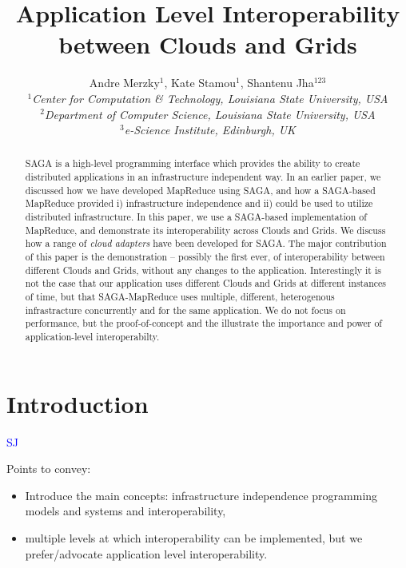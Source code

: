 \documentclass[conference,final]{IEEEtran}
\title{Application Level Interoperability between Clouds and Grids}
\author{Andre Merzky$^{1}$,  Kate Stamou$^{1}$, Shantenu Jha$^{123}$\\
  \small{\emph{$^{1}$Center for Computation \& Technology, Louisiana
      State University, USA}}\\
  \small{\emph{$^{2}$Department of Computer Science, Louisiana State
      University, USA}}\\
  \small{\emph{$^{3}$e-Science Institute, Edinburgh, UK}}\\
}
\newcommand{\sagamapreduce }{SAGA-MapReduce }
\begin{document}
\maketitle

\begin{abstract}
  SAGA is a high-level programming interface which provides the
  ability to create distributed applications in an infrastructure
  independent way.  In an earlier paper, we discussed how we have
  developed MapReduce using SAGA, and how a SAGA-based MapReduce
  provided i) infrastructure independence and ii) could be used to
  utilize distributed infrastructure. In this paper, we use a
  SAGA-based implementation of MapReduce, and demonstrate its
  interoperability across Clouds and Grids.  We discuss how a range of
  {\it cloud adapters} have been developed for SAGA.  The major
  contribution of this paper is the demonstration -- possibly the
  first ever, of interoperability between different Clouds and Grids,
  without any changes to the application. Interestingly it is not the
  case that our application uses different Clouds and Grids at
  different instances of time, but that \sagamapreduce uses multiple,
  different, heterogenous infrastracture concurrently and for the same
  application. We do not focus on performance, but the
  proof-of-concept and the illustrate the importance and power of
  application-level interoperabilty.
\end{abstract}

\section{Introduction} {\textcolor{blue} {SJ}}


Points to convey:

\begin{itemize}
\item Introduce the main concepts: infrastructure independence
  programming models and systems and interoperability,
\item multiple levels at which interoperability can be implemented,
  but we prefer/advocate application level interoperability.
\end{itemize}
\end{document}
